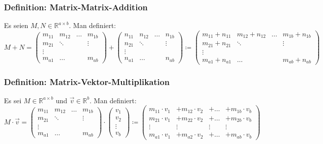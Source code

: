 \documentclass{article}
\begin{document}
  	\subsubsection{Definition: Matrix-Matrix-Addition}
  	Es seien $M, N \in \mathbb{R}^{a \times b}$. Man definiert: 
  	\begin{equation*}
  		M + N = 
  		\begin{pmatrix}
  			m_{11}&m_{12}&\ldots&m_{1b} \\
  			m_{21}&\ddots&&\vdots \\
  			\vdots&&& \\
  			m_{a1}&\ldots&&m_{ab}
  		\end{pmatrix}
  		+
  		\begin{pmatrix}
  			n_{11}&n_{12}&\ldots&n_{1b} \\
  			n_{21}&\ddots&&\vdots \\
  			\vdots&&& \\
  			n_{a1}&\ldots&&n_{ab}
  		\end{pmatrix}
  		\coloneqq
  		\begin{pmatrix}
  			m_{11} + n_{11}&m_{12} + n_{12}&\ldots&m_{1b} + n_{1b} \\
  			m_{21} + n_{21}&\ddots&&\vdots \\
  			\vdots&&& \\
  			m_{a1} + n_{a1}&\ldots&&m_{ab} + n_{ab}
  		\end{pmatrix}
  	\end{equation*}
  	
  	\subsubsection{Definition: Matrix-Vektor-Multiplikation}
  	Es sei $M \in \mathbb{R}^{a \times b}$ und $\vec{v} \in \mathbb{R}^b$. Man definiert: 
  	\begin{equation*}
  		M \cdot \vec{v} = 
  		\begin{pmatrix}
  			m_{11}&m_{12}&\ldots&m_{1b} \\
  			m_{21}&\ddots&&\vdots \\
  			\vdots&&& \\
  			m_{a1}&\ldots&&m_{ab}
  		\end{pmatrix}
  		\cdot
  		\begin{pmatrix}
  			v_1 \\
  			v_2 \\
  			\vdots \\
  			v_b
  		\end{pmatrix}
  		\coloneqq
  		\begin{pmatrix}
  			m_{11} \cdot v_1 &+ m_{12} \cdot v_2 &+ \ldots &+ m_{1b} \cdot v_b \\
  			m_{21} \cdot v_1 &+ m_{22} \cdot v_2 &+ \ldots &+ m_{2b} \cdot v_b \\
  			\vdots & \vdots & \vdots & \vdots \\
  			m_{a1} \cdot v_1 &+ m_{a2} \cdot v_2 &+ \ldots &+ m_{ab} \cdot v_b
  		\end{pmatrix}
  	\end{equation*}
  
\end{document}

